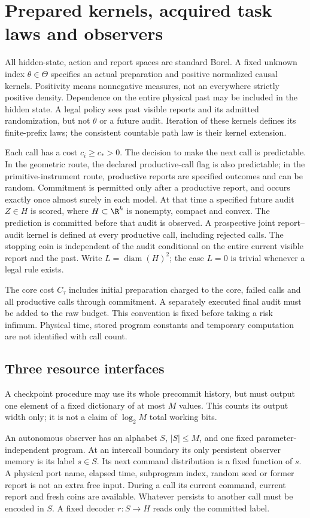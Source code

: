\section{Prepared kernels, acquired task laws and observers}\label{sec:data}
All hidden-state, action and report spaces are standard Borel. A fixed unknown index $\theta\in\Theta$ specifies an actual preparation and positive normalized causal kernels. Positivity means nonnegative measures, not an everywhere strictly positive density. Dependence on the entire physical past may be included in the hidden state. A legal policy sees past visible reports and its admitted randomization, but not $\theta$ or a future audit. Iteration of these kernels defines its finite-prefix laws; the consistent countable path law is their kernel extension.

Each call has a cost $c_i\ge c_*>0$. The decision to make the next call is predictable. In the geometric route, the declared productive-call flag is also predictable; in the primitive-instrument route, productive reports are specified outcomes and can be random. Commitment is permitted only after a productive report, and occurs exactly once almost surely in each model. At that time a specified future audit $Z\in H$ is scored, where $H\subset\R^k$ is nonempty, compact and convex. The prediction is committed before that audit is observed. A prospective joint report--audit kernel is defined at every productive call, including rejected calls. The stopping coin is independent of the audit conditional on the entire current visible report and the past. Write $L=\operatorname{diam}(H)^2$; the case $L=0$ is trivial whenever a legal rule exists.

The core cost $C_\tau$ includes initial preparation charged to the core, failed calls and all productive calls through commitment. A separately executed final audit must be added to the raw budget. This convention is fixed before taking a risk infimum. Physical time, stored program constants and temporary computation are not identified with call count.

\subsection*{Three resource interfaces}
A checkpoint procedure may use its whole precommit history, but must output one element of a fixed dictionary of at most $M$ values. This counts its output width only; it is not a claim of $\log_2 M$ total working bits.

An autonomous observer has an alphabet $S$, $|S|\le M$, and one fixed parameter-independent program. At an intercall boundary its only persistent observer memory is its label $s\in S$. Its next command distribution is a fixed function of $s$. A physical port name, elapsed time, subprogram index, random seed or former report is not an extra free input. During a call its current command, current report and fresh coins are available. Whatever persists to another call must be encoded in $S$. A fixed decoder $r:S\to H$ reads only the committed label.

